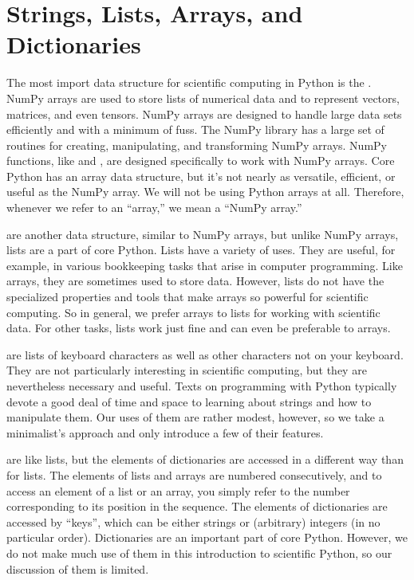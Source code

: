 \documentclass[letterpaper,10pt,english]{sphinxmanual}
\begin{document}
\chapter{Strings, Lists, Arrays, and Dictionaries}
\label{\detokenize{chap3/chap3_arrays:strings-lists-arrays-and-dictionaries}}\label{\detokenize{chap3/chap3_arrays:chap3}}\label{\detokenize{chap3/chap3_arrays::doc}}
\ignorespaces 
\sphinxAtStartPar
The most import data structure for scientific computing in Python is the .  NumPy arrays are used to store lists of numerical data and to represent vectors, matrices, and even tensors.  NumPy arrays are designed to handle large data sets efficiently and with a minimum of fuss.  The NumPy library has a large set of routines for creating, manipulating, and transforming NumPy arrays.  NumPy functions, like  and , are designed specifically to work with NumPy arrays.  Core Python has an array data structure, but it’s not nearly as versatile, efficient, or useful as the NumPy array.  We will not be using Python arrays at all.  Therefore, whenever we refer to an “array,” we mean a “NumPy array.”

\ignorespaces 
\sphinxAtStartPar
{} are another data structure, similar to NumPy arrays, but unlike NumPy arrays, lists are a part of core Python.  Lists have a variety of uses.  They are useful, for example, in various bookkeeping tasks that arise in computer programming.  Like arrays, they are sometimes used to store data.  However, lists do not have the specialized properties and tools that make arrays so powerful for scientific computing.   So in general, we prefer arrays to lists for working with scientific data. For other tasks, lists work just fine and can even be preferable to arrays.

\ignorespaces 
\sphinxAtStartPar
{} are lists of keyboard characters as well as other characters not on your keyboard.  They are not particularly interesting in scientific computing, but they are nevertheless necessary and useful.  Texts on programming with Python typically devote a good deal of time and space to learning about strings and how to manipulate them.  Our uses of them are rather modest, however, so we take a minimalist’s approach and only introduce a few of their features.

\ignorespaces 
\sphinxAtStartPar
{} are like lists, but the elements of dictionaries are accessed in a different way than for lists.  The elements of lists and arrays are numbered consecutively, and to access an element of a list or an array, you simply refer to the number corresponding to its position in the sequence.  The elements of dictionaries are accessed by “keys”, which can be either strings or (arbitrary) integers (in no particular order).  Dictionaries are an important part of core Python.  However, we do not make much use of them in this introduction to scientific Python, so our discussion of them is limited.
\end{document}
